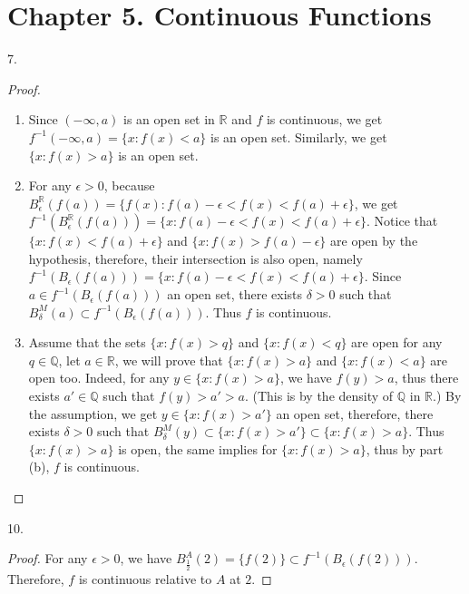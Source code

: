 \documentclass[12pt, a4paper]{article}
\theoremstyle{plain}
\newcommand{\Q}{\mathbb{Q}}
\newcommand{\R}{\mathbb{R}}
\begin{document}
\pagebreak

\section*{Chapter 5. Continuous Functions}

7.
\begin{proof}
\hfill
\begin{enumerate}[label=(\alph*)]
\item Since $(-\infty,a)$ is an open set in $\R$ and $f$ is continuous, we get $f^{-1}(-\infty,a)=\{x:f(x)<a\}$ is an open set. Similarly, we get $\{x:f(x)>a\}$ is an open set.

\item For any $\epsilon>0$, because $B_\epsilon^\R(f(a))=\{f(x):f(a)-\epsilon<f(x)<f(a)+\epsilon\}$, we get $f^{-1}(B_\epsilon^\R(f(a)))=\{x:f(a)-\epsilon<f(x)<f(a)+\epsilon\}$. Notice that $\{x:f(x)<f(a)+\epsilon\}$ and $\{x:f(x)>f(a)-\epsilon\}$ are open by the hypothesis, therefore, their intersection is also open, namely $f^{-1}(B_\epsilon(f(a)))=\{x:f(a)-\epsilon<f(x)<f(a)+\epsilon\}$. Since $a\in f^{-1}(B_\epsilon(f(a)))$ an open set, there exists $\delta>0$ such that $B_\delta^M(a)\subset f^{-1}(B_\epsilon(f(a)))$. Thus $f$ is continuous.

\item Assume that the sets $\{x:f(x)>q\}$ and $\{x:f(x)<q\}$ are open for any $q\in\Q$, let $a\in\R$, we will prove that $\{x:f(x)>a\}$ and $\{x:f(x)<a\}$ are open too. Indeed, for any $y\in\{x:f(x)>a\}$, we have $f(y)>a$, thus there exists $a'\in\Q$ such that $f(y)>a'>a$. (This is by the density of $\Q$ in $\R$.) By the assumption, we get $y\in \{x:f(x)>a'\}$ an open set, therefore, there exists $\delta>0$ such that $B_\delta^M(y)\subset\{x:f(x)>a'\}\subset \{x:f(x)>a\}$. Thus $\{x:f(x)>a\}$ is open, the same implies for $\{x:f(x)>a\}$, thus by part (b), $f$ is continuous.
\end{enumerate}
\end{proof}

10.
\begin{proof}
For any $\epsilon>0$, we have $B_\frac{1}{2}^A(2)=\{f(2)\}\subset f^{-1}(B_\epsilon(f(2)))$. Therefore, $f$ is continuous relative to $A$ at $2$.
\end{proof}

\pagebreak
\end{document}
